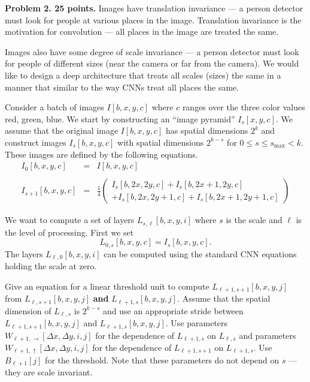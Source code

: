 \documentclass{article}
\begin{document}
\bigskip
{\bf Problem 2. 25 points.} Images have translation invariance --- a person detector must look for people at various places in the image.  Translation invariance is the motivation for
convolution --- all places in the image are treated the same.

\medskip
Images also have some degree of scale invariance --- a person detector must look for people of different sizes
(near the camera or far from the camera).  We would like to design a deep architecture that treats all scales (sizes) the same in a manner that similar to the way CNNs
treat all places the same.

\medskip
Consider a batch of images
$I[b,x,y,c]$ where $c$ ranges over the three color values red, green, blue. We start by constructing an ``image pyramid'' $I_s[x,y,c]$.
We assume that the original image $I[b,x,y,c]$ has spatial dimensions $2^k$ and construct images $I_s[b,x,y,c]$ with spatial dimensions $2^{k-s}$
for $0 \leq s \leq s_{\mathrm{max}} < k$.  These images are defined by the following equations.
\begin{eqnarray*}
  I_0[b,x,y,c] & = & I[b,x,y,c] \\
  \\
  I_{s+1}[b,x,y,c] & = & \frac{1}{4}\left(\begin{array}{l} I_s[b,2x,2y,c] + I_s[b,2x+1,2y,c] \\ + I_s[b,2x,2y+1,c] + I_s[b,2x+1,2y+1,c]\end{array}\right)
\end{eqnarray*}


We want to compute a set of layers $L_{s,\ell}[b,x,y,i]$ where $s$ is the scale and $\ell$ is the level of processing.  First we set
$$L_{0,s}[b,x,y,c] = I_s[b,x,y,c].$$
The layers $L_{\ell,0}[b,x,y,i]$ can be computed using the standard CNN equations holding the scale at zero.

\medskip
Give an equation for a linear threshold unit to compute $L_{\ell+1,s+1}[b,x,y,j]$ from $L_{\ell,s+1}[b,x,y,j]$ {\bf and} $L_{\ell+1,s}[b,x,y,j]$.  Assume that the
spatial dimension of $L_{\ell,s}$ is $2^{k-s}$ and use an appropriate stride between $L_{\ell+1,s+1}[b,x,y,j]$ and $L_{\ell+1,s}[b,x,y,j]$.  Use parameters
$W_{\ell+1,\rightarrow}[\Delta x, \Delta y, i,j]$ for the dependence of $L_{\ell+1,s}$ on $L_{\ell,s}$ and
parameters
$W_{\ell+1,\uparrow}[\Delta x, \Delta y, i,j]$ for the dependence of $L_{\ell+1,s+1}$ on $L_{\ell+1,s}$.  Use $B_{\ell+1}[j]$ for the threshold.
Note that these parameters do not depend on $s$ --- they are scale invariant.
\end{document}

